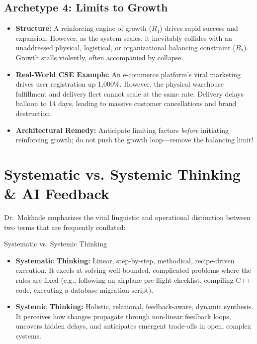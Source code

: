\subsection{Archetype 4: Limits to Growth}
\begin{itemize}[leftmargin=1.5em]
    \item \textbf{Structure:} A reinforcing engine of growth ($R_1$) drives rapid success and expansion. However, as the system scales, it inevitably collides with an unaddressed physical, logistical, or organizational balancing constraint ($B_2$). Growth stalls violently, often accompanied by collapse.
    \item \textbf{Real-World CSE Example:} An e-commerce platform's viral marketing drives user registration up 1,000\%. However, the physical warehouse fulfillment and delivery fleet cannot scale at the same rate. Delivery delays balloon to 14 days, leading to massive customer cancellations and brand destruction.
    \item \textbf{Architectural Remedy:} Anticipate limiting factors \textit{before} initiating reinforcing growth; do not push the growth loop—remove the balancing limit!
\end{itemize}

\section{Systematic vs. Systemic Thinking \& AI Feedback}
\label{sec:systematic_vs_systemic}

Dr.~Mokhade emphasizes the vital linguistic and operational distinction between two terms that are frequently conflated:

\begin{definitionbox}{Systematic vs. Systemic Thinking}
\begin{itemize}[leftmargin=1.5em]
    \item \textbf{Systematic Thinking:} Linear, step-by-step, methodical, recipe-driven execution. It excels at solving well-bounded, complicated problems where the rules are fixed (e.g., following an airplane pre-flight checklist, compiling C++ code, executing a database migration script).
    \item \textbf{Systemic Thinking:} Holistic, relational, feedback-aware, dynamic synthesis. It perceives how changes propagate through non-linear feedback loops, uncovers hidden delays, and anticipates emergent trade-offs in open, complex systems.
\end{itemize}
\end{definitionbox}


